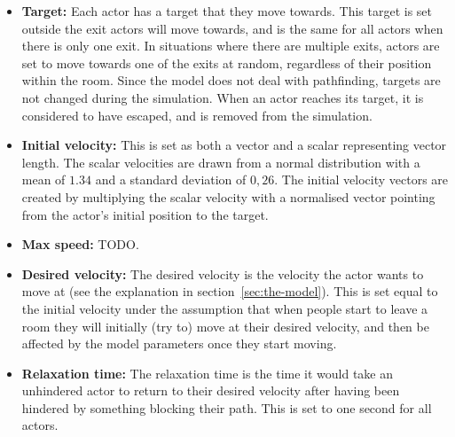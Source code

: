 \begin{itemize}
    \item \textbf{Target:} Each actor has a target that they move towards. 
        This target is set outside the exit actors will move towards, and is 
        the same for all actors when there is only one exit. In situations 
        where there are multiple exits, actors are set to move towards one of 
        the exits at random, regardless of their position within the room. 
        Since the model does not deal with pathfinding, targets are not 
        changed during the simulation. When an actor reaches its target, it is 
        considered to have escaped, and is removed from the simulation.

    \item \textbf{Initial velocity:} This is set as both a vector and a scalar 
        representing vector length. The scalar velocities are drawn from a 
        normal distribution with a mean of $1.34$ and a standard deviation of 
        $0,26$. The initial velocity vectors are created by multiplying the 
        scalar velocity with a normalised vector pointing from the actor's 
        initial position to the target.

    \item \textbf{Max speed:} TODO.

    \item \textbf{Desired velocity:} The desired velocity is the velocity the 
        actor wants to move at (see the explanation in 
        section~\ref{sec:the-model}). This is set equal to the initial velocity 
        under the assumption that when people start to leave a room they will 
        initially (try to) move at their desired velocity, and then be 
        affected by the model parameters once they start moving.

    \item \textbf{Relaxation time:} The relaxation time is the time it would 
        take an unhindered actor to return to their desired velocity after 
        having been hindered by something blocking their path. This is set to 
        one second for all actors.


\end{itemize}
